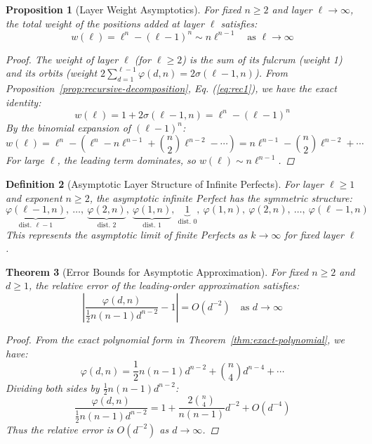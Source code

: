 \documentclass[11pt]{article}
\newtheorem{definition}{Definition}[section]
\newtheorem{theorem}[definition]{Theorem}
\newtheorem{proposition}[definition]{Proposition}
\begin{document}
\begin{proposition}[Layer Weight Asymptotics]\label{prop:layer-asymptotics}
For fixed $n \geq 2$ and layer $\ell \to \infty$, the total weight of the positions added at layer $\ell$ satisfies:
\[
w(\ell) = \ell^n - (\ell-1)^n \sim n \ell^{n-1} \quad \text{as } \ell \to \infty
\]
\begin{proof}
The weight of layer $\ell$ (for $\ell \geq 2$) is the sum of its fulcrum (weight 1) and its orbits (weight $2\sum_{d=1}^{\ell-1} \varphi(d,n) = 2\sigma(\ell-1,n)$).
From Proposition~\ref{prop:recursive-decomposition}, Eq. (\ref{eq:rec1}), we have the exact identity:
\[
w(\ell) = 1 + 2\sigma(\ell-1,n) = \ell^n - (\ell-1)^n
\]
By the binomial expansion of $(\ell-1)^n$:
\[
w(\ell) = \ell^n - \left( \ell^n - n\ell^{n-1} + \binom{n}{2}\ell^{n-2} - \cdots \right)
= n\ell^{n-1} - \binom{n}{2}\ell^{n-2} + \cdots
\]
For large $\ell$, the leading term dominates, so $w(\ell) \sim n\ell^{n-1}$.
\end{proof}
\end{proposition}

\begin{definition}[Asymptotic Layer Structure of Infinite Perfects]\label{def:asymptotic-layer}
For layer $\ell \geq 1$ and exponent $n \geq 2$, the asymptotic infinite Perfect has the symmetric structure:
\[
\underbrace{\varphi(\ell-1,n)}_{\text{dist. }\ell-1},\ \ldots,\ \underbrace{\varphi(2,n)}_{\text{dist. }2},\ \underbrace{\varphi(1,n)}_{\text{dist. }1},\ \underbrace{1}_{\text{dist. }0},\ \varphi(1,n),\ \varphi(2,n),\ \ldots,\ \varphi(\ell-1,n)
\]
This represents the asymptotic limit of finite Perfects as $k \to \infty$ for fixed layer $\ell$.
\end{definition}

\begin{theorem}[Error Bounds for Asymptotic Approximation]\label{thm:error-bounds}
For fixed $n \geq 2$ and $d \geq 1$, the relative error of the leading-order approximation satisfies:
\[
\left| \frac{\varphi(d,n)}{\frac{1}{2}n(n-1)d^{n-2}} - 1 \right| = O(d^{-2}) \quad \text{as } d \to \infty
\]
\begin{proof}
From the exact polynomial form in Theorem~\ref{thm:exact-polynomial}, we have:
\[
\varphi(d,n) = \frac{1}{2}n(n-1)d^{n-2} + \binom{n}{4}d^{n-4} + \cdots
\]
Dividing both sides by $\frac{1}{2}n(n-1)d^{n-2}$:
\[
\frac{\varphi(d,n)}{\frac{1}{2}n(n-1)d^{n-2}} = 1 + \frac{2\binom{n}{4}}{n(n-1)}d^{-2} + O(d^{-4})
\]
Thus the relative error is $O(d^{-2})$ as $d \to \infty$.
\end{proof}
\end{theorem}
\end{document}
